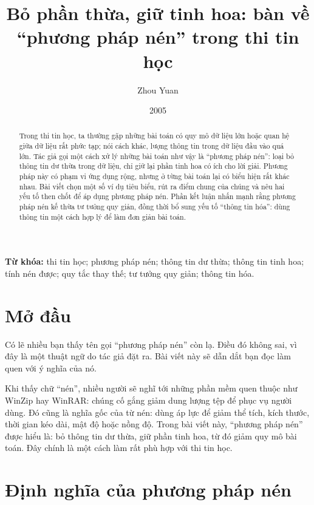 \documentclass[11pt]{article}
\title{Bỏ phần thừa, giữ tinh hoa: bàn về ``phương pháp nén'' trong thi tin học}
\author{Zhou Yuan}
\date{2005}
\begin{document}
\maketitle


\renewcommand{\abstractname}{Tóm tắt}
\begin{abstract}
Trong thi tin học, ta thường gặp những bài toán có quy mô dữ liệu lớn hoặc
quan hệ giữa dữ liệu rất phức tạp; nói cách khác, lượng thông tin trong dữ
liệu đầu vào quá lớn. Tác giả gọi một cách xử lý những bài toán như vậy là
``phương pháp nén'': loại bỏ thông tin dư thừa trong dữ liệu, chỉ giữ lại phần
tinh hoa có ích cho lời giải. Phương pháp này có phạm vi ứng dụng rộng, nhưng
ở từng bài toán lại có biểu hiện rất khác nhau. Bài viết chọn một số ví dụ
tiêu biểu, rút ra điểm chung của chúng và nêu hai yếu tố then chốt để áp dụng
phương pháp nén. Phần kết luận nhấn mạnh rằng phương pháp nén kế thừa tư tưởng
quy giản, đồng thời bổ sung yếu tố ``thông tin hóa'': dùng thông tin một cách
hợp lý để làm đơn giản bài toán.
\end{abstract}

\noindent\textbf{Từ khóa:} thi tin học; phương pháp nén; thông tin dư thừa;
thông tin tinh hoa; tính nén được; quy tắc thay thế; tư tưởng quy giản; thông
tin hóa.

\section{Mở đầu}

Có lẽ nhiều bạn thấy tên gọi ``phương pháp nén'' còn lạ. Điều đó không sai,
vì đây là một thuật ngữ do tác giả đặt ra. Bài viết này sẽ dẫn dắt bạn đọc
làm quen với ý nghĩa của nó.

Khi thấy chữ ``nén'', nhiều người sẽ nghĩ tới những phần mềm quen thuộc như
WinZip hay WinRAR: chúng cố gắng giảm dung lượng tệp để phục vụ người dùng.
Đó cũng là nghĩa gốc của từ nén: dùng áp lực để giảm thể tích, kích thước,
thời gian kéo dài, mật độ hoặc nồng độ. Trong bài viết này, ``phương pháp
nén'' được hiểu là: bỏ thông tin dư thừa, giữ phần tinh hoa, từ đó giảm quy
mô bài toán. Đây chính là một cách làm rất phù hợp với thi tin học.

\section{Định nghĩa của phương pháp nén}
\end{document}
